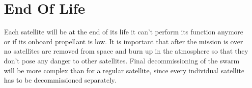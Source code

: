 \section{End Of Life}
\label{blSSEOL}

Each satellite will be at the end of its life it can't perform its function anymore or if its onboard propellant is low.
It is important that after the mission is over no satellites are removed from space and burn up in the atmosphere so that they don't pose any danger to other satellites.
Final decommissioning of the swarm will be more complex than for a regular satellite, since every individual satellite has to be decommissioned separately.